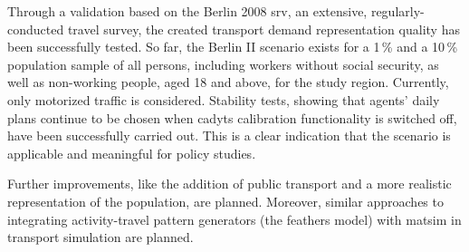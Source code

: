 Through a validation based on the Berlin 2008 \gls{srv}, an extensive, regularly-conducted travel survey, the created transport demand representation quality has been successfully tested. So far, the Berlin II scenario exists for a 1\,\% and a 10\,\% population sample of all persons, \ie including workers without social security, as well as non-working people, aged 18 and above, for the study region. Currently, only motorized traffic is considered. Stability tests, showing that agents' daily plans continue to be chosen when \gls{cadyts} calibration functionality is switched off, have been successfully carried out. This is a clear indication that the scenario is applicable and meaningful for policy studies.

Further improvements, like the addition of public transport and a more realistic representation of the population, are planned. Moreover, similar approaches to integrating activity-travel pattern generators (\eg the \gls{feathers} model) with \gls{matsim} in transport simulation are planned.

%
%

